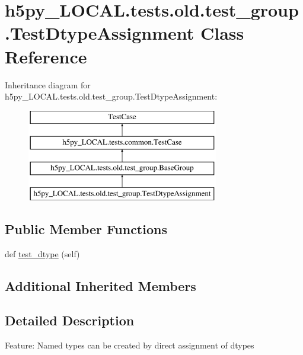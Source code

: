 \hypertarget{classh5py__LOCAL_1_1tests_1_1old_1_1test__group_1_1TestDtypeAssignment}{}\section{h5py\+\_\+\+L\+O\+C\+A\+L.\+tests.\+old.\+test\+\_\+group.\+Test\+Dtype\+Assignment Class Reference}
\label{classh5py__LOCAL_1_1tests_1_1old_1_1test__group_1_1TestDtypeAssignment}
Inheritance diagram for h5py\+\_\+\+L\+O\+C\+A\+L.\+tests.\+old.\+test\+\_\+group.\+Test\+Dtype\+Assignment\+:\begin{figure}[H]
\begin{center}
\leavevmode
\includegraphics[height=4.000000cm]{classh5py__LOCAL_1_1tests_1_1old_1_1test__group_1_1TestDtypeAssignment}
\end{center}
\end{figure}
\subsection*{Public Member Functions}
\begin{DoxyCompactItemize}
\item 
def \hyperlink{classh5py__LOCAL_1_1tests_1_1old_1_1test__group_1_1TestDtypeAssignment_a10037032cc575ddc44edad3134901c27}{test\+\_\+dtype} (self)
\end{DoxyCompactItemize}
\subsection*{Additional Inherited Members}


\subsection{Detailed Description}
\begin{DoxyVerb}    Feature: Named types can be created by direct assignment of dtypes
\end{DoxyVerb}
 

